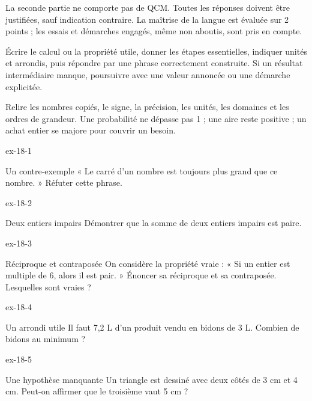 \begin{propriete}La seconde partie ne comporte pas de QCM. Toutes les réponses doivent être justifiées, sauf indication contraire. La maîtrise de la langue est évaluée sur 2 points ; les essais et démarches engagés, même non aboutis, sont pris en compte.\end{propriete}
\begin{savoirfaire}[Rédiger]Écrire le calcul ou la propriété utile, donner les étapes essentielles, indiquer unités et arrondis, puis répondre par une phrase correctement construite. Si un résultat intermédiaire manque, poursuivre avec une valeur annoncée ou une démarche explicitée.\end{savoirfaire}
\begin{savoirfaire}[Vérifier]Relire les nombres copiés, le signe, la précision, les unités, les domaines et les ordres de grandeur. Une probabilité ne dépasse pas 1 ; une aire reste positive ; un achat entier se majore pour couvrir un besoin.\end{savoirfaire}
\clearpage{}
\begin{blocLivre}{ex-18-1}\begin{exercice}[1]{Un contre-exemple}
« Le carré d’un nombre est toujours plus grand que ce nombre. » Réfuter cette phrase.
\end{exercice}\end{blocLivre}
\begin{blocLivre}{ex-18-2}\begin{exercice}[1]{Deux entiers impairs}
Démontrer que la somme de deux entiers impairs est paire.
\end{exercice}\end{blocLivre}
\begin{blocLivre}{ex-18-3}\begin{exercice}[1]{Réciproque et contraposée}
On considère la propriété vraie : « Si un entier est multiple de 6, alors il est pair. » Énoncer sa réciproque et sa contraposée. Lesquelles sont vraies ?
\end{exercice}\end{blocLivre}
\begin{blocLivre}{ex-18-4}\begin{exercice}[1]{Un arrondi utile}
Il faut 7,2 L d’un produit vendu en bidons de 3 L. Combien de bidons au minimum ?
\end{exercice}\end{blocLivre}
\begin{blocLivre}{ex-18-5}\begin{exercice}[1]{Une hypothèse manquante}
Un triangle est dessiné avec deux côtés de 3 cm et 4 cm. Peut-on affirmer que le troisième vaut 5 cm ?
\end{exercice}\end{blocLivre}

